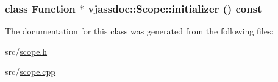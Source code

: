 \hypertarget{classvjassdoc_1_1Scope_33866d7c3eac290c01e57e1919b26cda}{
\subsubsection{\setlength{\rightskip}{0pt plus 5cm}class {\bf Function} $\ast$ vjassdoc::Scope::initializer () const}}
\label{classvjassdoc_1_1Scope_33866d7c3eac290c01e57e1919b26cda}




The documentation for this class was generated from the following files:\begin{CompactItemize}
\item 
src/\hyperlink{scope_8h}{scope.h}\item 
src/\hyperlink{scope_8cpp}{scope.cpp}\end{CompactItemize}
